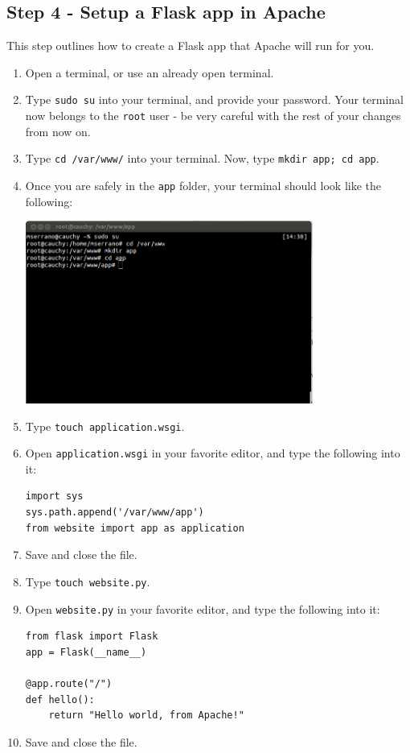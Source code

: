 \documentclass{article}
\begin{document}
\subsection{Step 4 - Setup a Flask app in Apache}
This step outlines how to create a Flask app that Apache will run for you.
\begin{enumerate}
\item Open a terminal, or use an already open terminal.
\item Type \verb+sudo su+ into your terminal, and provide your password. Your terminal
now belongs to the \verb+root+ user - be very careful with the rest of your changes
from now on.
\item Type \verb+cd /var/www/+ into your terminal. Now, type \verb+mkdir app; cd app+.
\item Once you are safely in the \verb+app+ folder, your terminal should look like the following:

\includegraphics[height=6cm]{pic4.png}

\item Type \verb+touch application.wsgi+.
\item Open \verb+application.wsgi+ in your favorite editor, and type the following into it:
\begin{verbatim}
import sys
sys.path.append('/var/www/app')
from website import app as application
\end{verbatim}
\item Save and close the file.
\item Type \verb+touch website.py+.
\item Open \verb+website.py+ in  your favorite editor, and type the following into it:
\begin{verbatim}
from flask import Flask
app = Flask(__name__)

@app.route("/")
def hello():
    return "Hello world, from Apache!"
\end{verbatim}
\item Save and close the file.
\end{enumerate}
\end{document}
